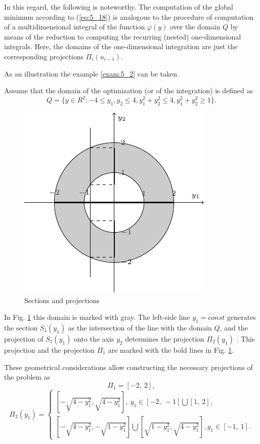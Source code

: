 In this regard, the following is noteworthy. The computation of the global minimum according to (\ref{eq:5_18}) is analogous to the procedure of computation of a multidimensional integral of the function $\varphi(y)$ over the domain $Q$ by means of the reduction to computing  the recurring (nested) one-dimensional integrals. Here, the domains of the one-dimensional integration are just the corresponding projections $\Pi_i(u_{i-1})$.

As an illustration the example \ref{exam:5_2} can be taken. 
\begin{example}
\label{exam:5_2}
Assume that the domain of the optimization (or of the integration) is defined as
\begin{displaymath}
Q=\{y\in R^2:-4\leq y_1,y_2\leq 4, y_1^2+y_2^2\leq 4,y_1^2+y_2^2\geq 1\}.
\end{displaymath}
\begin{figure}[t]
\centering
\includegraphics[width=0.8\linewidth]{figures/figure_5_5.pdf}
\caption{Sections and projections}
\label{fig:5_5}    
\end{figure}
In Fig. \ref{fig:5_5} this domain is marked with gray. The left-side line $y_1=const$  generates the section $S_1(y_1)$  as the intersection of the line with the domain $Q$, and the projection  of $S_1(y_1)$  onto the axis $y_2$  determines the projection $\Pi_2(y_1)$ . This projection and the projection $\Pi_1$  are marked with the bold lines in Fig. \ref{fig:5_5}.

These geometrical considerations allow constructing the necessary projections of the problem as 
\begin{displaymath}
\Pi_1=[-2,\:2],
\end{displaymath}
\begin{displaymath}
\Pi_2(y_1)=
  \begin{cases}
    [-\sqrt{4-y_1^2}, \sqrt{4-y_1^2}],\ y_1\in [-2,\:-1]\bigcup [1,\:2],  \\
    [-\sqrt{4-y_1^2}, -\sqrt{1-y_1^2}]\bigcup [\sqrt{1-y_1^2}, \sqrt{4-y_1^2}],y_1\in [-1,\:1].                      	
  \end{cases}
\end{displaymath}
\end{example}

